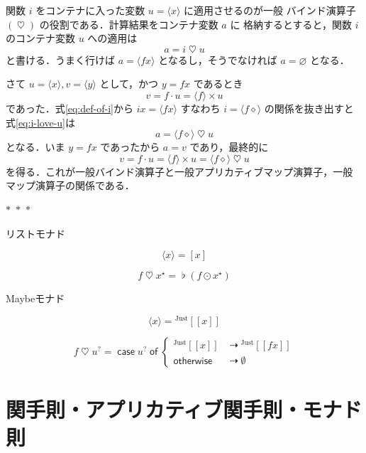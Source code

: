 \documentclass[a5paper,twoside,fleqn,draft]{jsbook}
\def\[{\left[\!\left[}
\def\]{\right]\!\right]}
\newcommand{\separator}{\begin{center}$*$~$*$~$*$\end{center}}
\newcommand{\mKeyword}[1]{\mathsf{#1}} %
\newcommand{\mCaseKeyword}{\mKeyword{case}}
\newcommand{\mOfKeyword}{\mKeyword{of}}
\newcommand{\mOtherwiseKeyword}{\mKeyword{otherwise}}
\DeclareMathOperator{\mCaseKW}{\mCaseKeyword} %
\DeclareMathOperator{\mOfKW}{\mOfKeyword} %
\DeclareMathOperator{\mOtherwise}{\mOtherwiseKeyword}
\newcommand{\mNothing}{\emptyset}
\newcommand{\mPureNothing}{\varnothing}
\newcommand{\mAnonParam}{\diamond}
\DeclareMathOperator{\mAppMap}{\times}
\DeclareMathOperator{\mBind}{\heartsuit}
\DeclareMathOperator{\mConcat}{\flat}
\DeclareMathOperator{\mIfSo}{\dashrightarrow}
\DeclareMathOperator{\mMap}{\cdot} %
\DeclareMathOperator{\mMapList}{\odot}
\newcommand{\mValueConstructor}[1]{\mathrm{#1}}
\newcommand{\mGenericValueAssemble}[2]{{}^\mValueConstructor{#1}\[#2\]}
\newcommand{\mJustWith}[1]{\mGenericValueAssemble{Just}{#1}}
\newcommand{\mPureWith}[1]{\langle#1\rangle}
\newcommand{\mList}[1]{{#1}^\mathrm{\star}}
\newcommand{\mMaybe}[1]{{#1}^?}
\newcommand{\mCaseOf}[1]{\mCaseKW#1\mOfKW}
\begin{document}
関数 $i$ をコンテナに入った変数 $u=\mPureWith{x}$ に適用させるのが一般
バインド演算子 $(\mBind)$ の役割である．計算結果をコンテナ変数 $a$ に
格納するとすると，関数 $i$ のコンテナ変数 $u$ への適用は
\begin{equation}
\label{eq:i-love-u}
a=i\mBind u
\end{equation}
と書ける．うまく行けば $a=\mPureWith{fx}$ となるし，そうでなければ
$a=\mPureNothing$ となる．

さて $u=\mPureWith{x},v=\mPureWith{y}$ として，かつ $y=fx$ であるとき
\begin{equation}
v=f\mMap u=\mPureWith{f}\mAppMap u
\end{equation}
であった．式\eqref{eq:def-of-i}から $ix=\mPureWith{fx}$ すなわち
$i=\mPureWith{f\mAnonParam}$ の関係を抜き出すと式\eqref{eq:i-love-u}は
\begin{equation}
a=\mPureWith{f\mAnonParam}\mBind u
\end{equation}
となる．いま $y=fx$ であったから $a=v$ であり，最終的に
\begin{equation}
v=f\mMap u=\mPureWith{f}\mAppMap u=\mPureWith{f\mAnonParam}\mBind u
\end{equation}
を得る．これが一般バインド演算子と一般アプリカティブマップ演算子，一般
マップ演算子の関係である．

\separator

リストモナド

\begin{equation}
  \mPureWith{x}=[x]
\end{equation}

\begin{equation}
  f\mBind\mList{x}=\mConcat(f\mMapList\mList{x})
\end{equation}

Maybeモナド

\begin{equation}
  \mPureWith{x}=\mJustWith{x}
\end{equation}

\begin{equation}
  f\mBind\mMaybe{u}=\mCaseOf{\mMaybe{u}}\begin{cases}
    \mJustWith{x}&\mIfSo\mJustWith{fx}\\
    \mOtherwise&\mIfSo\mNothing
  \end{cases}
\end{equation}

\section{関手則・アプリカティブ関手則・モナド則}
\end{document}
